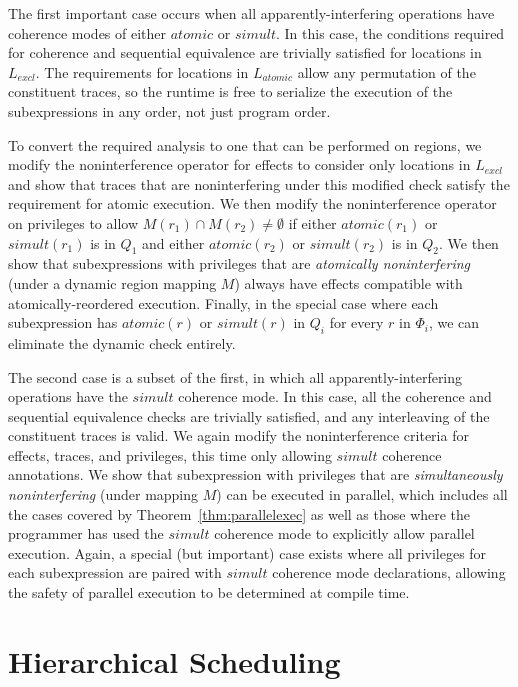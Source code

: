 The first important case occurs when all apparently-interfering operations have coherence modes
of either $atomic$ or $simult$.  In this case, the conditions required for
coherence and sequential equivalence are trivially satisfied for locations in $L_{excl}$.  The
requirements for locations in $L_{atomic}$ allow any permutation of the constituent traces,
so the runtime is free to serialize the execution of the subexpressions in any order, not just
program order.

To convert the required analysis to one that can be performed on regions, we modify
the noninterference operator for effects to consider only locations in $L_{excl}$ and show that
traces that are noninterfering under this modified check satisfy the requirement for atomic
execution.  We then modify the noninterference operator on privileges to allow 
$M(r_1) \cap M(r_2) \not= \emptyset$ if either $atomic(r_1)$ or $simult(r_1)$ is in $Q_1$ and
either $atomic(r_2)$ or $simult(r_2)$ is in $Q_2$. We then show that subexpressions with 
privileges that are {\em atomically noninterfering} (under a dynamic region mapping
$M$) always have effects compatible with atomically-reordered execution.  Finally,
in the special case where each subexpression has $atomic(r)$ or $simult(r)$ in $Q_i$ for every $r$
in $\Phi_i$, we can eliminate the dynamic check entirely.

The second case is a subset of the first, in which all apparently-interfering operations have
the $simult$ coherence mode.  In this case, all the coherence and sequential equivalence 
checks are trivially satisfied, and any interleaving of the constituent traces is valid.
We again modify the noninterference criteria for effects, traces, and privileges, this time
only allowing $simult$ coherence annotations. We show that subexpression with privileges
that are {\em simultaneously noninterfering} (under mapping $M$) can be executed
in parallel, which includes all the cases covered by Theorem~\ref{thm:parallelexec} as well
as those where the programmer has used the $simult$ coherence mode to explicitly allow parallel
execution.  Again, a special (but important) case exists where all privileges for each
subexpression are paired with $simult$ coherence mode declarations, allowing the safety of
parallel execution to be determined at compile time.

\section{Hierarchical Scheduling}
\label{sec:scheduling}

